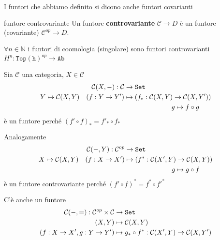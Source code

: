 \begin{note}{}
    I funtori che abbiamo definito si dicono anche funtori covarianti
\end{note}
\begin{definition}{funtore controvariante}
    Un funtore \textbf{controvariante} \(\mathcal{C} \to D\) è un funtore (covariante) \(\mathcal{C}^{op} \to D\).
\end{definition}
\begin{example}{}
    \(\forall n \in \mathbb{N}\) i funtori di coomologia (singolare) sono funtori
    controvarianti \(H^{n} : \mathtt{Top(h)}^{op} \to \mathtt{Ab}\) 
\end{example}
\begin{example}{}
    Sia \(\mathcal{C}\) una categoria, \(X \in \mathcal{C}\)
    \begin{align*}
        \mathcal{C}{(X, \--)} : \mathcal{C} &\to \mathtt{Set} \\
        Y \mapsto \mathcal{C}{(X, Y)} \quad {(f : Y \to Y')} &\mapsto {(f_{*} : \mathcal{C}{(X, Y)} \to \mathcal{C}{(X, Y')})} \\
            & \quad \quad \quad \quad\quad\quad\quad  g \mapsto f \circ g
    \end{align*}
    è un funtore perché \({(f' \circ f)}_* = f'_* \circ f_*\) 

    Analogamente 
    \begin{align*}
        \mathcal{C}{(\--, Y)} : \mathcal{C}^{op} &\to \mathtt{Set} \\
        X \mapsto \mathcal{C}{(X, Y)} \quad {(f : X \to X')} &\mapsto {(f^{*} : \mathcal{C}{(X', Y)} \to \mathcal{C}{(X, Y)})} \\
            & \quad \quad \quad \quad\quad\quad\quad  g \mapsto g \circ f
    \end{align*}
    è un funtore controvariante perché \({(f' \circ f )}^{*} = f^{*} \circ f'^{*}\) 
\end{example}
\begin{remark}{}
    C'è anche un funtore 
    \begin{align*}
        \mathcal{C}{(\--, =)} : \mathcal{C}^{op} \times \mathcal{C} &\to \mathtt{Set} \\
        {(X, Y)} &\mapsto \mathcal{C}{(X, Y)} \\
        {(f : X \to X', g : Y \to Y')} &\mapsto g_* \circ f^* :
        \mathcal{C}{(X', Y)} \to  \mathcal{C}{(X,Y')}
    \end{align*}
\end{remark}
